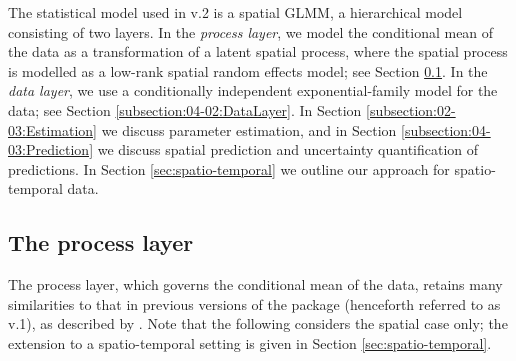 \documentclass[nojss]{jss}
\begin{document}
The statistical model used in  v.2 is a spatial GLMM, a hierarchical model consisting of two layers.
 In the %
\textit{process layer}, we model the conditional mean of the data as a transformation of a latent spatial process, where the spatial process is modelled as a low-rank spatial random effects model; see Section  \ref{subsection:04-01:ProcessLayer}. 
 In the %
\textit{data layer}, we use a conditionally independent exponential-family model for the data; see Section \ref{subsection:04-02:DataLayer}. 
In Section \ref{subsection:02-03:Estimation} we discuss parameter estimation, and in Section \ref{subsection:04-03:Prediction} we discuss spatial prediction and uncertainty quantification of predictions.
In Section \ref{sec:spatio-temporal} we outline our approach for spatio-temporal data. 







\subsection{The process layer} \label{subsection:04-01:ProcessLayer}

The process layer, which governs the conditional mean of the data, retains many similarities to that in previous versions of the package (henceforth referred to as  v.1), as described by \cite{FRK_paper}. 
 Note that the following considers the spatial case only; the extension to a spatio-temporal setting is given in Section \ref{sec:spatio-temporal}. 
 
\end{document}
